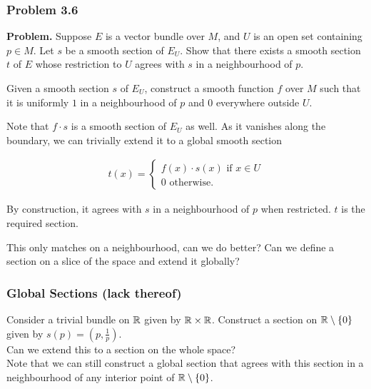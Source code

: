 \begin{frame}
    \frametitle{Problem 3.6}

    \textbf{Problem. } Suppose \(E\) is a vector bundle over \(M\), and \(U\) is
    an open set containing \(p \in M\). Let \(s\) be a smooth section of
    \(E_U\). Show that there exists a smooth section \(t\) of \(E\) whose
    restriction to \(U\) agrees with \(s\) in a neighbourhood of \(p\).

\end{frame}


\begin{frame}
    
    Given a smooth section \(s\) of \(E_U\), construct a smooth function \(f\)
    over \(M\) such that it is uniformly \(1\) in a neighbourhood of \(p\) and
    \(0\) everywhere outside \(U\). 

    Note that \(f\cdot s\) is a smooth section of \(E_U\) as well. As it
    vanishes along the boundary, we can trivially extend it to a global smooth
    section

    \begin{gather}
        t(x) = \begin{cases}
            f(x)\cdot s(x) \text{ if } x \in U \\
            0 \text{ otherwise.}
        \end{cases}
    \end{gather}

\end{frame}

\begin{frame}
    
    By construction, it agrees with \(s\) in a neighbourhood of \(p\) when
    restricted. \(t\) is the required section.

    This only matches on a neighbourhood, can we do better? Can we define a
    section on a slice of the space and extend it globally?

\end{frame}

\begin{frame}
    \frametitle{Global Sections (lack thereof)}

    Consider a trivial bundle on \(\mathbb{R}\) given by \(\mathbb{R} \times \mathbb{R}\).
    Construct a section on \(\mathbb{R} \setminus \{0\}\) given by \(s(p) = (p,
    \frac{1}{p})\).\\

    Can we extend this to a section on the whole space? \\

    Note that we can still construct a global section that agrees with this
    section in a neighbourhood of any interior point of \(\mathbb{R} \setminus
    \{0\}\).

\end{frame}